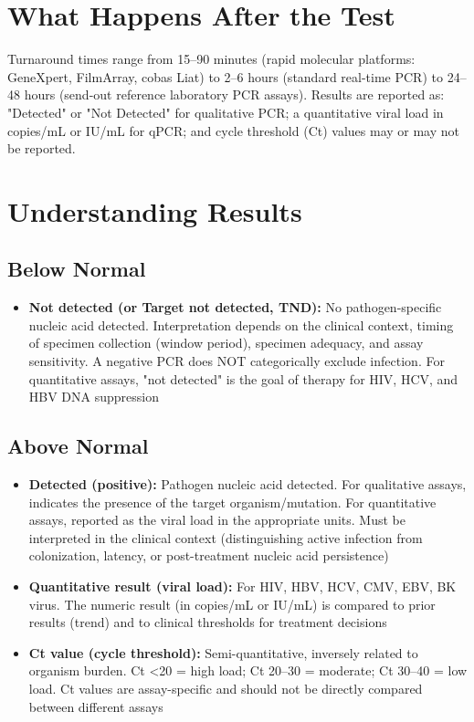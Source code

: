 \section*{What Happens After the Test}
Turnaround times range from 15--90 minutes (rapid molecular platforms: GeneXpert, FilmArray, cobas Liat) to 2--6 hours (standard real-time PCR) to 24--48 hours (send-out reference laboratory PCR assays). Results are reported as: "Detected" or "Not Detected" for qualitative PCR; a quantitative viral load in copies/mL or IU/mL for qPCR; and cycle threshold (Ct) values may or may not be reported.

\section*{Understanding Results}

\subsection*{Below Normal}
\begin{itemize}
  \item \textbf{Not detected (or Target not detected, TND):} No pathogen-specific nucleic acid detected. Interpretation depends on the clinical context, timing of specimen collection (window period), specimen adequacy, and assay sensitivity. A negative PCR does NOT categorically exclude infection. For quantitative assays, "not detected" is the goal of therapy for HIV, HCV, and HBV DNA suppression
\end{itemize}

\subsection*{Above Normal}
\begin{itemize}
  \item \textbf{Detected (positive):} Pathogen nucleic acid detected. For qualitative assays, indicates the presence of the target organism/mutation. For quantitative assays, reported as the viral load in the appropriate units. Must be interpreted in the clinical context (distinguishing active infection from colonization, latency, or post-treatment nucleic acid persistence)
  \item \textbf{Quantitative result (viral load):} For HIV, HBV, HCV, CMV, EBV, BK virus. The numeric result (in copies/mL or IU/mL) is compared to prior results (trend) and to clinical thresholds for treatment decisions
  \item \textbf{Ct value (cycle threshold):} Semi-quantitative, inversely related to organism burden. Ct <20 = high load; Ct 20--30 = moderate; Ct 30--40 = low load. Ct values are assay-specific and should not be directly compared between different assays
\end{itemize}

